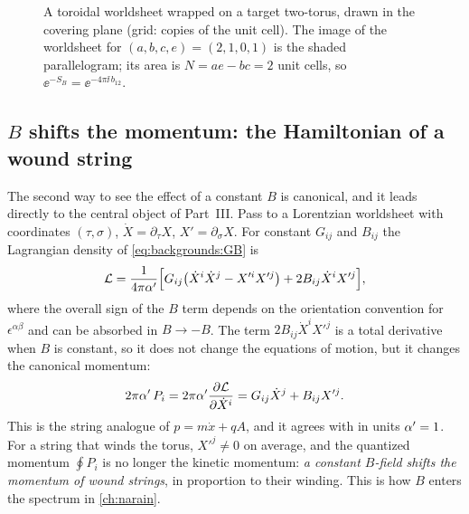 \begin{figure}[ht]
\centering
{}
\caption{A toroidal worldsheet wrapped on a target two-torus, drawn in the covering plane
(grid: copies of the unit cell). The image of the worldsheet for $(a,b,c,e)=(2,1,0,1)$ is the
shaded parallelogram; its area is $N=ae-bc=2$ unit cells, so
$\ee^{-S_B}=\ee^{-4\pi\ii\,b_{12}}$.}
\label{fig:backgrounds:wrap}
\end{figure}

\subsection{\texorpdfstring{$B$}{B} shifts the momentum: the Hamiltonian of a wound string}

The second way to see the effect of a constant $B$ is canonical, and it leads directly to
the central object of Part~III. Pass to a Lorentzian worldsheet with coordinates
$(\tau,\sigma)$, $\dot X=\partial_\tau X$, $X'=\partial_\sigma X$. For constant $G_{ij}$ and
$B_{ij}$ the Lagrangian density of \eqref{eq:backgrounds:GB} is
\[
  \mathcal L=\frac{1}{4\pi\alpha'}\Bigl[G_{ij}\bigl(\dot X^i\dot X^j-X'^iX'^j\bigr)
  +2B_{ij}\dot X^iX'^j\Bigr],
\]
where the overall sign of the $B$ term depends on the orientation convention for
$\epsilon^{\alpha\beta}$ and can be absorbed in $B\to-B$. The term
$2B_{ij}\dot X^iX'^j$ is a total derivative when $B$ is constant, so it does not change the
equations of motion, but it changes the canonical momentum:
\begin{equation}\label{eq:backgrounds:momentum}
  2\pi\alpha'\,P_i=2\pi\alpha'\frac{\partial\mathcal L}{\partial\dot X^i}=G_{ij}\dot X^j+B_{ij}X'^j .
\end{equation}
This is the string analogue of $p=m\dot x+qA$, and it agrees with
 in units $\alpha'=1$. For a string that winds the torus,
$X'^j\neq0$ on average, and the quantized momentum $\oint P_i$ is no longer the kinetic
momentum: \emph{a constant $B$-field shifts the momentum of wound strings}, in proportion to
their winding. This is how $B$ enters the spectrum in \cref{ch:narain}.

